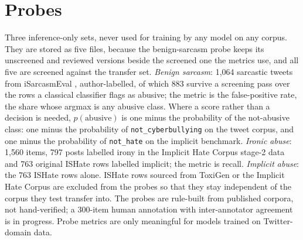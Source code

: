 \section{Probes}
\label{sec:4.3}
Three inference-only sets, never used for training by any model on any corpus. They are stored as
five files, because the benign-sarcasm probe keeps its unscreened and reviewed versions beside the
screened one the metrics use, and all five are screened against the transfer set. \emph{Benign
sarcasm}: 1,064 sarcastic tweets from iSarcasmEval \cite{abufarha2022semeval, oprea2020isarcasm},
author-labelled, of which 883 survive a screening pass over the rows a classical classifier flags as
abusive; the metric is the false-positive rate, the share whose argmax is any abusive class. Where a
score rather than a decision is needed, $p(\text{abusive})$ is one minus the probability of the
not-abusive class: one minus the probability of \texttt{not\_cyberbullying} on the tweet corpus, and
one minus the probability of \texttt{not\_hate} on the implicit benchmark. \emph{Ironic abuse}:
1,560 items, 797 posts labelled irony in the Implicit Hate Corpus stage-2 data and 763 original
ISHate rows labelled implicit; the metric is recall. \emph{Implicit abuse}: the 763 ISHate rows
alone. ISHate rows sourced from ToxiGen or the Implicit Hate Corpus are excluded from the probes so
that they stay independent of the corpus they test transfer into. The probes are rule-built from
published corpora, not hand-verified; a 300-item human annotation with inter-annotator agreement
\cite{fleiss1971measuring} is in progress. Probe metrics are only meaningful for models trained on
Twitter-domain data.
